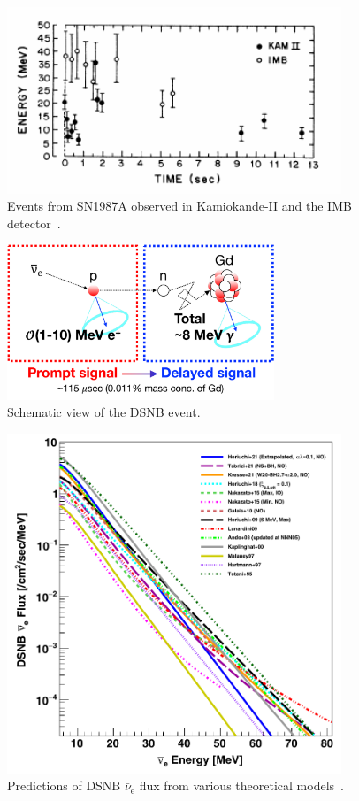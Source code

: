 \begin{figure}[tbp]
	\centering
	\includegraphics[width=10cm]{Figures/Introduction/KamIMB}
	\caption[Events from SN1987A observed in Kamiokande-II and the IMB detector]{\label{Introd_KamIMB} Events from SN1987A observed in Kamiokande-II and the IMB detector~\cite{1988Hirata}.}
\end{figure}

\begin{figure}[tbp]
	\centering
	\includegraphics[width=8cm]{Figures/Introduction/IBD}
	\caption[Schematic view of the DSNB event]{\label{Introd_IBD} Schematic view of the DSNB event.}
\end{figure}

\begin{figure}[tbp]
	\centering
	\includegraphics[width=10cm]{Figures/Introduction/DSNBpred}
	\caption[Predictions of DSNB $\bar{\nu}_{\text{e}}$ flux from various theoretical models]{\label{Introd_DSNBpred} Predictions of DSNB $\bar{\nu}_{\text{e}}$ flux from various theoretical models~\cite{2021Abe}.}
\end{figure}

